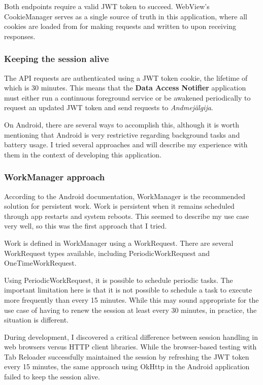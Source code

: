 Both endpoints require a valid JWT token to succeed. WebView's CookieManager serves as a single source of truth in this application, where all cookies are loaded from for making requests and written to upon receiving responses.

\subsubsection{Keeping the session alive}
The API requests are authenticated using a JWT token cookie, the lifetime of which is 30 minutes. This means that the \textbf{Data Access Notifier} application must either run a continuous foreground service or be awakened periodically to request an updated JWT token and send requests to \textit{Andmejälgija}.

On Android, there are several ways to accomplish this, although it is worth mentioning that Android is very restrictive regarding background tasks and battery usage. I tried several approaches and will describe my experience with them in the context of developing this application.

\subsubsection{WorkManager approach}
According to the Android documentation, WorkManager is the recommended solution for persistent work. Work is persistent when it remains scheduled through app restarts and system reboots. This seemed to describe my use case very well, so this was the first approach that I tried.

Work is defined in WorkManager using a WorkRequest. There are several WorkRequest types available, including PeriodicWorkRequest and OneTimeWorkRequest.

Using PeriodicWorkRequest, it is possible to schedule periodic tasks. The important limitation here is that it is not possible to schedule a task to execute more frequently than every 15 minutes. While this may sound appropriate for the use case of having to renew the session at least every 30 minutes, in practice, the situation is different.

During development, I discovered a critical difference between session handling in web browsers versus HTTP client libraries. While the browser-based testing with Tab Reloader successfully maintained the session by refreshing the JWT token every 15 minutes, the same approach using OkHttp in the Android application failed to keep the session alive.

